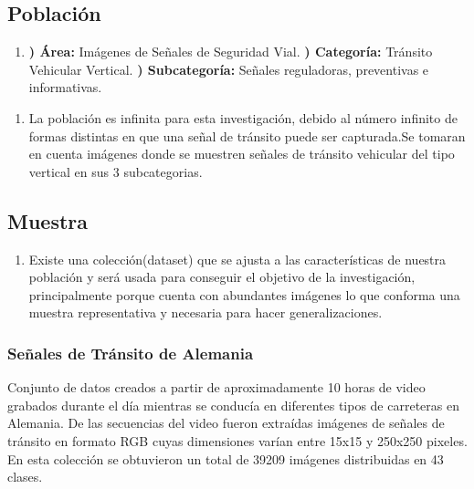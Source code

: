 		\subsection{Población} 
		\begin{enumerate}
		\item[]				
		{\bf *) Área:} Imágenes de Señales de Seguridad Vial.\vskip 0.1cm
		{\bf *) Categoría:} Tránsito Vehicular Vertical.\vskip 0.1cm
		{\bf *) Subcategoría:} Señales reguladoras, preventivas e informativas.\vskip 0.1cm
		\end{enumerate}
		\begin{enumerate}		
			\item[]  La población es infinita para esta investigación, debido al número infinito de formas distintas en que una señal de tránsito puede ser capturada.Se tomaran en cuenta imágenes donde se muestren señales de tránsito vehicular del tipo vertical en sus 3 subcategorias.
		\end{enumerate}

		\subsection{Muestra} 
		\begin{enumerate}		
			\item[]	Existe una colección(dataset) que se ajusta a las características de nuestra población y será usada para conseguir el objetivo de la investigación, principalmente porque cuenta con abundantes imágenes lo que conforma una muestra representativa y necesaria para hacer generalizaciones. 
		\end{enumerate}

		\subsubsection{Señales de Tránsito de Alemania} \citep{Stallkamp-IJCNN-2011} 
			Conjunto de datos creados a partir de aproximadamente 10 horas de video grabados durante el día mientras se conducía en diferentes tipos de carreteras en Alemania. De las secuencias del video fueron extraídas imágenes de señales de tránsito en formato RGB cuyas dimensiones varían entre 15x15 y 250x250 pixeles. En esta colección se obtuvieron un total de 39209 imágenes distribuidas en 43 clases. 
		
		
